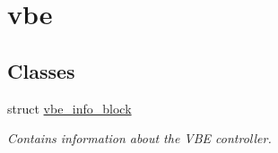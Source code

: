 \hypertarget{group__vbe}{}\section{vbe}
\label{group__vbe}
\subsection*{Classes}
\begin{DoxyCompactItemize}
\item 
struct \mbox{\hyperlink{structvbe__info__block}{vbe\+\_\+info\+\_\+block}}
\begin{DoxyCompactList}\small\item\em Contains information about the V\+BE controller. \end{DoxyCompactList}\end{DoxyCompactItemize}
